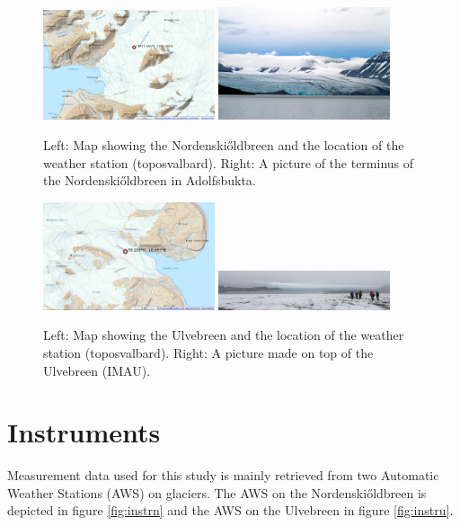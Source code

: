 \documentclass[11pt]{report}
\begin{document}
\begin{figure}[h]
\includegraphics[scale=1, width=0.45\textwidth]{nskimap.jpg}
\includegraphics[scale=1, width=0.45\textwidth]{view1.jpg}
\centering{}
\caption{Left: Map showing the Nordenski\H{o}ldbreen and the location of the weather station (toposvalbard). Right: A picture of the terminus of the Nordenski\H{o}ldbreen in Adolfsbukta.}
\label{fig:norden}
\end{figure}

\begin{figure}[h]
\includegraphics[scale=1, width=0.45\textwidth]{ulvemap.jpg}
\includegraphics[scale=1, width=0.45\textwidth]{view2.jpg}
\centering{}
\caption{Left: Map showing the Ulvebreen and the location of the weather station (toposvalbard). Right: A picture made on top of the Ulvebreen (IMAU).}
\label{fig:ulve}
\end{figure}

\newpage
\section{Instruments}\label{sec:instr}
Measurement data used for this study is mainly retrieved from two Automatic Weather Stations (AWS) on glaciers. The AWS on the Nordenski\H{o}ldbreen is depicted in figure \ref{fig:instrn} and the AWS on the Ulvebreen in figure \ref{fig:instru}.
\end{document}
